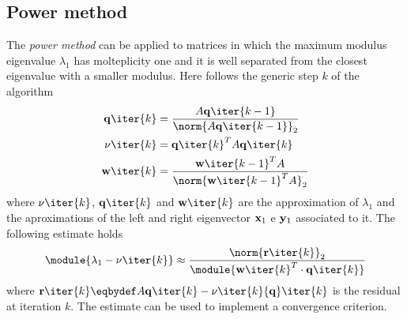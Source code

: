 \subsection*{Power method}

The \emph{power method} can be applied to matrices in which the maximum modulus
eigenvalue $\lambda_1$ has molteplicity one and it is well separated from the
closest eigenvalue with a smaller modulus. Here follows the generic step $k$ of
the algorithm
\begin{align*}
    {\bf q}\iter{k} &= \frac{ A{\bf q}\iter{k-1} }{
        \norm{ A{\bf q}\iter{k-1}}_2 } \\
    {\bf \nu}\iter{k} &= {{\bf q}\iter{k}}^T  A {\bf q}\iter{k} \\
    {\bf w}\iter{k} &= \frac{ {{\bf w}\iter{k-1}}^T A }{
        \norm{ {{\bf w}\iter{k-1}}^T A}_2 }
\end{align*}
where $\nu\iter{k}$, ${\bf q}\iter{k}$ and ${\bf w}\iter{k}$ are the
approximation of $\lambda_1$ and the aproximations of the left and right
eigenvector ${\bf x}_1$ e ${\bf y}_1$ associated to it. The following estimate
holds
\begin{align*}
    \module{ \lambda_1 - \nu\iter{k} } \approx %
    \frac{ \norm{ {\bf r}\iter{k} }_2 }{
    \module{ {{\bf w}\iter{k}}^T \cdot{\bf q}\iter{k} } }
\end{align*}
where ${\bf r}\iter{k} \eqbydef A{\bf q}\iter{k} - \nu\iter{k}{\bf
q}\iter{k}$ is the residual at iteration $k$. The estimate can be used to
implement a convergence criterion.
